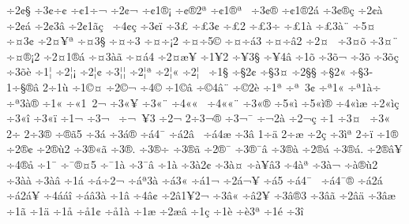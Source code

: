 {^^f72^^a2^^a7
^^f73^^a2^^f7^^a2
^^f7^^a21^^f7^^ac
^^f72^^a2^^ac
^^f7^^a21^^ae^^a1
^^f7^^a2^^ae2^^aa
^^f7^^a21^^ae^^aa^^a0
^^f73^^a2^^ae^^ad
^^f7^^a21^^ae2^^e1
^^f73^^a2^^ae^^e7
^^f72^^a2^^e0
^^f72^^a2^^e1
^^f72^^a23^^e2
^^f72^^a21^^e3^^e7^^a0
^^f74^^a2^^e7
^^f73^^a2^^ef
^^f73^^a3
^^f7^^a33^^a2
^^f7^^a32^^ad
^^f7^^a33^^ad^^f7
^^f7^^a31^^e0
^^f7^^a33^^e0^^a8
^^f75^^a4^^a0
^^f7^^a43^^a2
^^f72^^a4^^a5^^aa
^^f7^^a43^^a7
^^f7^^a4^^f73
^^f7^^a4^^f7^^a12
^^f7^^a4^^f75^^a9
^^f7^^a4^^f7^^e13
^^f7^^a4^^f7^^e22
^^f72^^a4^^ad^^a0
^^f73^^a4^^ad^^f5
^^f73^^a4^^ad^^a8
^^f7^^a4^^ae^^a12
^^f72^^a41^^ae^^e1
^^f7^^a43^^e0^^e3
^^f7^^a4^^e14
^^f72^^a4^^e6^^a5
^^f71^^a52
^^f7^^a53^^a7
^^f7^^a54^^e2
^^f71^^f5
^^f73^^f5^^ac
^^f73^^f5^^ad
^^f73^^f5^^e7
^^f73^^f5^^e8
^^f71^^a6
^^f72^^a6^^a1
^^f72^^a6^^a2
^^f73^^a6^^a6
^^f72^^a6^^aa
^^f72^^a6^^ab
^^f72^^a6^^ad^^a0
^^f71^^a7
^^f7^^a72^^a2
^^f7^^a73^^a4
^^f72^^a7^^a7
^^f7^^a72^^ab
^^f7^^a73^^ad
1^^f7^^a7^^ae^^e2
2^^f71^^f9
^^f71^^a9^^a4
^^f72^^a9^^ac
^^f74^^a9^^ad
^^f71^^a9^^e2
^^f7^^a94^^e2^^a8
^^f7^^a92^^e8
^^f71^^aa
^^f7^^aa^^a03^^a2
^^f7^^aa1^^ab
^^f7^^aa1^^e0^^f7
^^f7^^aa3^^e0^^ae
^^f71^^ab
^^f7^^ab1^^a02^^ac
^^f73^^ab^^a5
^^f73^^ab^^a8
^^f74^^ab^^ab^^a0
^^f74^^ab^^ab^^a8
^^f73^^ab^^ae
^^f75^^ab^^ec^^ad
^^f75^^ab^^ec^^ae
^^f74^^ab^^ec^^e6
^^f72^^ab^^ec^^e7
^^f73^^ab^^ee
^^f73^^ab^^ef
^^f71^^ac
^^f73^^ac^^a0
^^f7^^ac^^a0^^ad^^a53
^^f72^^ac^^ad
2^^f73^^ac^^ae
^^f73^^ac^^af
^^f7^^ac2^^e0
^^f72^^ac^^e7
^^f71^^ad
^^f73^^ad^^a4^^a0
^^f73^^ad^^ab
2^^f7^^ad^^ad
2^^f73^^ad^^ae
^^f7^^ad^^ae^^e35
^^f7^^ad3^^e1
^^f73^^ad^^e1^^ae
^^f7^^ad^^e14^^af
^^f7^^ad^^e12^^e2^^a0
^^f7^^ad^^e14^^e6
^^f73^^ad^^e2
1^^f7^^ad^^e4
2^^f7^^ad^^e6
^^f72^^ad^^e7
^^f73^^ad^^ec^^aa
2^^f7^^ad^^ef
^^f71^^ae
^^f72^^ae^^a2
^^f72^^ae^^f92
^^f73^^ae^^ab^^e3
^^f73^^ae^^ad.
^^f73^^ae^^ad^^f7
^^f73^^ae^^ad^^e3
^^f72^^ae^^af
^^f73^^ae^^af^^e2
^^f73^^ae^^e0
^^f72^^ae^^e1
^^f73^^ae^^e1.
^^f72^^ae^^e2^^a5
^^f74^^ae^^e5
^^f71^^af
^^f7^^af^^ae^^a45
^^f7^^af1^^e0
^^f73^^af^^e2
^^f71^^e0
^^f73^^e02^^a2
^^f73^^e0^^a4
^^f7^^e0^^a5^^e23
^^f74^^e0^^aa
^^f73^^e0^^ac
^^f7^^e0^^ae^^f92
^^f73^^e0^^e0
^^f73^^e0^^e2
^^f71^^e1
^^f7^^e1^^f72^^ac
^^f7^^e1^^aa3^^e0
^^f7^^e13^^ab
^^f7^^e11^^ac
^^f72^^e1^^ac^^a5
^^f7^^e15^^ad
^^f7^^e14^^af^^a0
^^f7^^e14^^af^^ae
^^f7^^e12^^e1^^a0
^^f7^^e12^^e1^^a5
^^f74^^e1^^e1^^ee
^^f7^^e1^^e23^^e0
^^f71^^e2
^^f74^^e2^^a2
^^f72^^e21^^a52^^ac
^^f73^^e2^^ab
^^f7^^e22^^ad^^a5
^^f73^^e2^^ae3
^^f73^^e2^^e3
^^f72^^e2^^e4
^^f73^^e2^^e6
^^f71^^e3
^^f71^^e4
^^f71^^e5
^^f7^^e51^^a2
^^f7^^e51^^e0
^^f71^^e6
^^f72^^e6^^e2
^^f71^^e7
^^f71^^e8
^^f7^^e83^^aa
^^f71^^e9
^^f73^^ee
}
